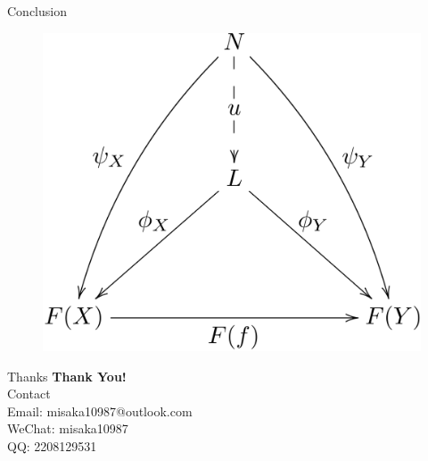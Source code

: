 \documentclass[aspectratio=169]{beamer}
\begin{document}
\begin{frame}{Conclusion}
\begin{figure}
			\includegraphics[height=0.4\textheight]{cone}
		\end{figure}
    \end{frame}

	\begin{frame}{Thanks}
		\centering
		{\Huge \textbf{Thank You!}}\\[2em]
		{Contact}\\[1em]
		{Email: misaka10987@outlook.com}\\
		{WeChat: misaka10987}\\
		{QQ: 2208129531}
	\end{frame}
	
\end{document}

